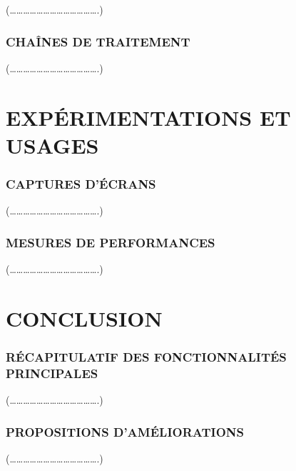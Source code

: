 \documentclass[a4paper]{article} %
\begin{document}
(………………………………….)
\subsubsection{CHAÎNES DE TRAITEMENT }

(………………………………….)


\section{EXPÉRIMENTATIONS ET USAGES }
\subsubsection{CAPTURES D’ÉCRANS }


(………………………………….)
\subsubsection{ MESURES DE PERFORMANCES }

(………………………………….)

\section{CONCLUSION}
\subsubsection{RÉCAPITULATIF DES FONCTIONNALITÉS PRINCIPALES }

(………………………………….)
\subsubsection{PROPOSITIONS D’AMÉLIORATIONS }

(………………………………….)
\end{document}
